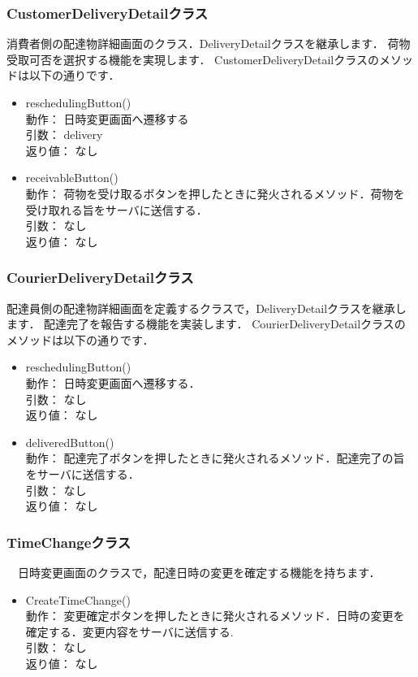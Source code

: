 \documentclass[a4j,titlepage]{jarticle}
\begin{document}
\subsubsection{CustomerDeliveryDetailクラス}
消費者側の配達物詳細画面のクラス．DeliveryDetailクラスを継承します．
荷物受取可否を選択する機能を実現します．
CustomerDeliveryDetailクラスのメソッドは以下の通りです．
\begin{itemize}
 \item reschedulingButton()\\
 動作： 日時変更画面へ遷移する\\
 引数： delivery\\
 返り値： なし

 \item receivableButton()\\
 動作： 荷物を受け取るボタンを押したときに発火されるメソッド．荷物を受け取れる旨をサーバに送信する．\\
 引数： なし\\
 返り値： なし
\end{itemize}

\subsubsection{CourierDeliveryDetailクラス}
配達員側の配達物詳細画面を定義するクラスで，DeliveryDetailクラスを継承します．
配達完了を報告する機能を実装します．
CourierDeliveryDetailクラスのメソッドは以下の通りです．
\begin{itemize}
\item reschedulingButton()\\
 動作： 日時変更画面へ遷移する．\\
 引数： なし\\
 返り値： なし

\item deliveredButton()\\
 動作： 配達完了ボタンを押したときに発火されるメソッド．配達完了の旨をサーバに送信する．\\
 引数： なし\\
 返り値： なし
\end{itemize}

\subsubsection{TimeChangeクラス}
　日時変更画面のクラスで，配達日時の変更を確定する機能を持ちます．
\begin{itemize}
 \item CreateTimeChange()\\
   動作： 変更確定ボタンを押したときに発火されるメソッド．日時の変更を確定する．変更内容をサーバに送信する.\\
 引数： なし\\
 返り値： なし
\end{itemize}
\end{document}
